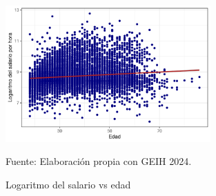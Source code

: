         \begin{figure}[H]
            \caption{Logaritmo del salario vs edad}
            \centering
            \includegraphics[width=0.7\textwidth]{imagenes/dispersion.pdf}
             \label{fig:scatter1}
            \begin{minipage}{7\textwidth}
            \footnotesize
            \hspace{3cm} Fuente: Elaboración propia con GEIH 2024.
       
            \end{minipage}
        \end{figure}